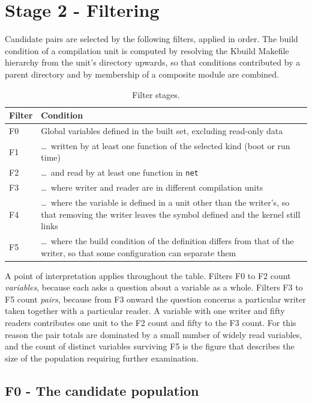 \documentclass[12pt, a4paper, oneside]{book}
\begin{document}
\section{Stage 2 - Filtering}

Candidate pairs are selected by the following filters, applied in order. The
build condition of a compilation unit is computed by resolving the Kbuild
Makefile hierarchy from the unit's directory upwards, so that conditions
contributed by a parent directory and by membership of a composite module are
combined.

\begin{table}[H]
\centering
\caption{Filter stages.}
\renewcommand{\arraystretch}{1.4}
\begin{tabularx}{\textwidth}{C{1.2cm} L{11.5cm}}
\toprule
\textbf{Filter} & \textbf{Condition} \\
\midrule
F0 & Global variables defined in the built set, excluding read-only data \\
F1 & \ldots\ written by at least one function of the selected kind (boot or run time) \\
F2 & \ldots\ and read by at least one function in \texttt{net} \\
F3 & \ldots\ where writer and reader are in different compilation units \\
F4 & \ldots\ where the variable is defined in a unit other than the writer's, so
     that removing the writer leaves the symbol defined and the kernel still links \\
F5 & \ldots\ where the build condition of the definition differs from that of the
     writer, so that some configuration can separate them \\
\bottomrule
\end{tabularx}
\end{table}

A point of interpretation applies throughout the table. Filters F0 to F2 count
\emph{variables}, because each asks a question about a variable as a whole.
Filters F3 to F5 count \emph{pairs}, because from F3 onward the question concerns
a particular writer taken together with a particular reader. A variable with one
writer and fifty readers contributes one unit to the F2 count and fifty to the F3
count. For this reason the pair totals are dominated by a small number of widely
read variables, and the count of distinct variables surviving F5 is the figure
that describes the size of the population requiring further examination.

\subsection{F0 - The candidate population}
\end{document}
